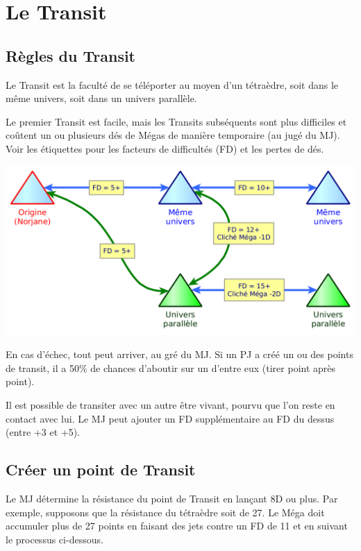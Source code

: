 \documentclass[11pt]{article}
\begin{document}
\newpage
\section{Le Transit}

\subsection{Règles du Transit}

Le Transit est la faculté de se téléporter au moyen d'un tétraèdre, soit dans le même univers, soit dans un univers parallèle.

Le premier Transit est facile, mais les Transits subséquents sont plus difficiles et coûtent un ou plusieurs dés de Mégas de manière temporaire (au jugé du MJ). Voir les étiquettes pour les facteurs de difficultés (FD) et les pertes de dés.

\begin{center}
\includegraphics[scale=0.3]{04-transit}
\end{center}

En cas d'échec, tout peut arriver, au gré du MJ. Si un PJ a créé un ou des points de transit, il a 50\% de chances d'aboutir sur un d'entre eux (tirer point après point).

Il est possible de transiter avec un autre être vivant, pourvu que l'on reste en contact avec lui. Le MJ peut ajouter un FD supplémentaire au FD du dessus (entre +3 et +5).

\subsection{Créer un point de Transit}

Le MJ détermine la résistance du point de Transit en lançant 8D ou plus. Par exemple, supposons que la résistance du tétraèdre soit de 27. Le Méga doit accumuler plus de 27 points en faisant des jets contre un FD de 11 et en suivant le processus ci-dessous.
\end{document}

